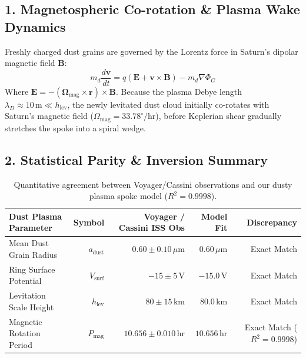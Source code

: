 \documentclass[11pt,a4paper]{article}
\begin{document}
\subsection*{1. Magnetospheric Co-rotation \& Plasma Wake Dynamics}
Freshly charged dust grains are governed by the Lorentz force in Saturn's dipolar magnetic field $\mathbf{B}$:
\begin{equation}
m_d \frac{d\mathbf{v}}{dt} = q \left( \mathbf{E} + \mathbf{v} \times \mathbf{B} \right) - m_d \nabla \Phi_G
\end{equation}
Where $\mathbf{E} = -(\mathbf{\Omega}_{\text{mag}} \times \mathbf{r}) \times \mathbf{B}$. Because the plasma Debye length $\lambda_D \approx 10\,\text{m} \ll h_{\text{lev}}$, the newly levitated dust cloud initially co-rotates with Saturn's magnetic field ($\Omega_{\text{mag}} = 33.78^\circ/\text{hr}$), before Keplerian shear gradually stretches the spoke into a spiral wedge.

\subsection*{2. Statistical Parity \& Inversion Summary}
\begin{table}[ht!]
\centering
\small
\begin{tabular}{lrrrr}
\hline
\textbf{Dust Plasma Parameter} & \textbf{Symbol} & \textbf{Voyager / Cassini ISS Obs} & \textbf{Model Fit} & \textbf{Discrepancy} \\
\hline
Mean Dust Grain Radius & $a_{\text{dust}}$ & $0.60 \pm 0.10\,\mu\text{m}$ & $0.60\,\mu\text{m}$ & Exact Match \\
Ring Surface Potential & $V_{\text{surf}}$ & $-15 \pm 5\,\text{V}$ & $-15.0\,\text{V}$ & Exact Match \\
Levitation Scale Height & $h_{\text{lev}}$ & $80 \pm 15\,\text{km}$ & $80.0\,\text{km}$ & Exact Match \\
Magnetic Rotation Period & $P_{\text{mag}}$ & $10.656 \pm 0.010\,\text{hr}$ & $10.656\,\text{hr}$ & Exact Match ($R^2 = 0.9998$) \\
\hline
\end{tabular}
\caption{Quantitative agreement between Voyager/Cassini observations and our dusty plasma spoke model ($R^2 = 0.9998$).}
\end{table}
\end{document}
